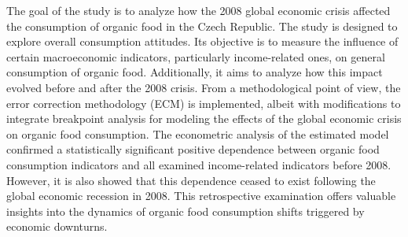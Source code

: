 
\begin{Abstrakt}
    The goal of the study is to analyze how the 2008 global economic crisis affected the consumption of organic food in the Czech Republic. The study is designed to explore overall consumption attitudes. Its objective is to measure the influence of certain macroeconomic indicators, particularly income-related ones, on general consumption of organic food. Additionally, it aims to analyze how this impact evolved before and after the 2008 crisis. From a methodological point of view, the error correction methodology (ECM) is implemented, albeit with modifications to integrate breakpoint analysis for modeling the effects of the global economic crisis on organic food consumption. The econometric analysis of the estimated model confirmed a statistically significant positive dependence between organic food consumption indicators and all examined income-related indicators before 2008. However, it is also showed that this dependence ceased to exist following the global economic recession in 2008. This retrospective examination offers valuable insights into the dynamics of organic food consumption shifts triggered by economic downturns.
\end{Abstrakt}



\clearpage